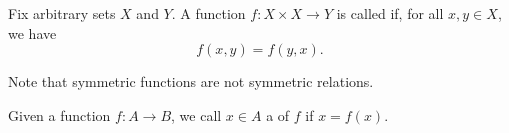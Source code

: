 \begin{definition}\label{def:symmetric_function}
  Fix arbitrary sets \( X \) and \( Y \). A function \( f: X \times X \to Y \) is called  if, for all \( x, y \in X \), we have
  \begin{equation*}
    f(x, y) = f(y, x).
  \end{equation*}

  Note that symmetric functions are not symmetric relations.
\end{definition}

\begin{definition}\label{def:fixed_point}
  Given a function \( f: A \to B \), we call \( x \in A \) a  of \( f \) if \( x = f(x) \).
\end{definition}
